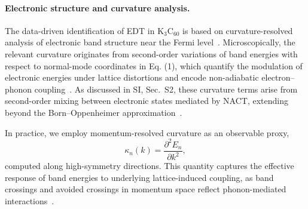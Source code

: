 \documentclass[twocolumn,10pt]{article}
\begin{document}
%
%

\paragraph*{Electronic structure and curvature analysis.}

The data-driven identification of EDT in K$_3$C$_{60}$ is based on curvature-resolved analysis of electronic band structure near the Fermi level~\cite{Gunnarsson1997,Capone2009}. Microscopically, the relevant curvature originates from second-order variations of band energies with respect to normal-mode coordinates in Eq. (1), which quantify the modulation of electronic energies under lattice distortions and encode non-adiabatic electron--phonon coupling~\cite{Mead1979,Yarkony1996,Giustino2017}. As discussed in SI, Sec.~S2, these curvature terms arise from second-order mixing between electronic states mediated by NACT, extending beyond the Born--Oppenheimer approximation~\cite{BornOppenheimer1927}.

In practice, we employ momentum-resolved curvature as an observable proxy,
\begin{equation}
\kappa_n(k) = \frac{\partial^2 E_n}{\partial k^2},
\end{equation}
computed along high-symmetry directions. This quantity captures the effective response of band energies to underlying lattice-induced coupling, as band crossings and avoided crossings in momentum space reflect phonon-mediated interactions~\cite{Xiao2010}.
\end{document}
